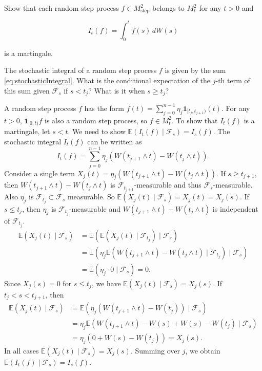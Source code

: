 \begin{Exercise}
\label{ex:7.5}
Show that each random step process $f \in M_{\mathrm{step}}^2$ belongs to $M_t^2$ for any $t > 0$ and

\begin{equation}
I_t(f) = \int_0^t f(s) \, dW(s)
\end{equation}

is a martingale.

\begin{hint}
The stochastic integral of a random step process $f$ is given by the sum \eqref{eq:stochasticIntegral}. What is the conditional expectation of the $j$-th term of this sum given $\mathcal{F}_s$ if $s < t_j$? What is it when $s \geq t_j$?
\end{hint}
\end{Exercise}

\begin{Solution}
A random step process $f$ has the form $f(t) = \sum_{j=0}^{n-1} \eta_j \mathbf{1}_{[t_j, t_{j+1})}(t)$. For any $t > 0$, $\mathbf{1}_{[0, t)}f$ is also a random step process, so $f \in M_t^2$.
To show that $I_t(f)$ is a martingale, let $s < t$. We need to show $\mathbb{E}(I_t(f) \mid \mathcal{F}_s) = I_s(f)$.
The stochastic integral $I_t(f)$ can be written as
\begin{equation*}
I_t(f) = \sum_{j=0}^{n-1} \eta_j (W(t_{j+1} \wedge t) - W(t_j \wedge t)).
\end{equation*}
Consider a single term $X_j(t) = \eta_j (W(t_{j+1} \wedge t) - W(t_j \wedge t))$.
If $s \geq t_{j+1}$, then $W(t_{j+1} \wedge t) - W(t_j \wedge t)$ is $\mathcal{F}_{t_{j+1}}$-measurable and thus $\mathcal{F}_s$-measurable. Also $\eta_j$ is $\mathcal{F}_{t_j} \subset \mathcal{F}_s$ measurable. So $\mathbb{E}(X_j(t) \mid \mathcal{F}_s) = X_j(t) = X_j(s)$.
If $s \leq t_j$, then $\eta_j$ is $\mathcal{F}_{t_j}$-measurable and $W(t_{j+1} \wedge t) - W(t_j \wedge t)$ is independent of $\mathcal{F}_{t_j}$.
\begin{align*}
\mathbb{E}(X_j(t) \mid \mathcal{F}_s) &= \mathbb{E}(\mathbb{E}(X_j(t) \mid \mathcal{F}_{t_j}) \mid \mathcal{F}_s) \\
&= \mathbb{E}(\eta_j \mathbb{E}(W(t_{j+1} \wedge t) - W(t_j \wedge t) \mid \mathcal{F}_{t_j}) \mid \mathcal{F}_s) \\
&= \mathbb{E}(\eta_j \cdot 0 \mid \mathcal{F}_s) = 0.
\end{align*}
Since $X_j(s) = 0$ for $s \leq t_j$, we have $\mathbb{E}(X_j(t) \mid \mathcal{F}_s) = X_j(s)$.
If $t_j < s < t_{j+1}$, then
\begin{align*}
\mathbb{E}(X_j(t) \mid \mathcal{F}_s) &= \mathbb{E}(\eta_j (W(t_{j+1} \wedge t) - W(t_j)) \mid \mathcal{F}_s) \\
&= \eta_j \mathbb{E}(W(t_{j+1} \wedge t) - W(s) + W(s) - W(t_j) \mid \mathcal{F}_s) \\
&= \eta_j (0 + W(s) - W(t_j)) = X_j(s).
\end{align*}
In all cases $\mathbb{E}(X_j(t) \mid \mathcal{F}_s) = X_j(s)$. Summing over $j$, we obtain $\mathbb{E}(I_t(f) \mid \mathcal{F}_s) = I_s(f)$.
\end{Solution}

